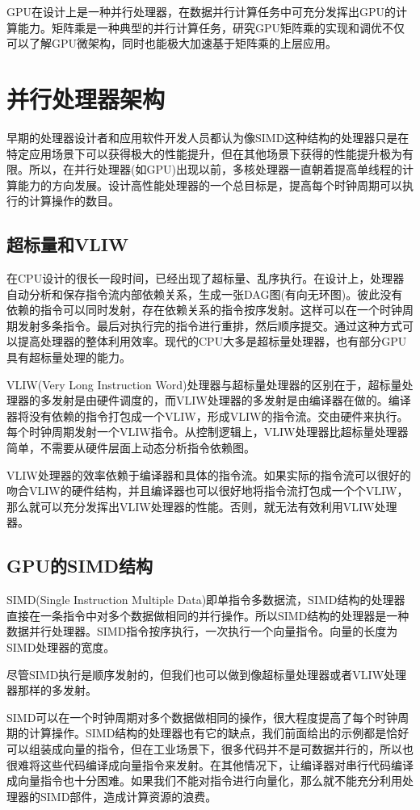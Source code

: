 GPU在设计上是一种并行处理器，在数据并行计算任务中可充分发挥出GPU的计算能力。矩阵乘是一种典型的并行计算任务，研究GPU矩阵乘的实现和调优不仅可以了解GPU微架构，同时也能极大加速基于矩阵乘的上层应用。

\section{并行处理器架构}
早期的处理器设计者和应用软件开发人员都认为像SIMD这种结构的处理器只是在特定应用场景下可以获得极大的性能提升，但在其他场景下获得的性能提升极为有限。所以，在并行处理器(如GPU)出现以前，多核处理器一直朝着提高单线程的计算能力的方向发展。设计高性能处理器的一个总目标是，提高每个时钟周期可以执行的计算操作的数目。

\subsection{超标量和VLIW}
在CPU设计的很长一段时间，已经出现了超标量、乱序执行。在设计上，处理器自动分析和保存指令流内部依赖关系，生成一张DAG图(有向无环图)。彼此没有依赖的指令可以同时发射，存在依赖关系的指令按序发射。这样可以在一个时钟周期发射多条指令。最后对执行完的指令进行重排，然后顺序提交。通过这种方式可以提高处理器的整体利用效率。现代的CPU大多是超标量处理器，也有部分GPU具有超标量处理的能力。

VLIW(Very Long Instruction Word)处理器与超标量处理器的区别在于，超标量处理器的多发射是由硬件调度的，而VLIW处理器的多发射是由编译器在做的。编译器将没有依赖的指令打包成一个VLIW，形成VLIW的指令流。交由硬件来执行。每个时钟周期发射一个VLIW指令。从控制逻辑上，VLIW处理器比超标量处理器简单，不需要从硬件层面上动态分析指令依赖图。

VLIW处理器的效率依赖于编译器和具体的指令流。如果实际的指令流可以很好的吻合VLIW的硬件结构，并且编译器也可以很好地将指令流打包成一个个VLIW，那么就可以充分发挥出VLIW处理器的性能。否则，就无法有效利用VLIW处理器。


\subsection{GPU的SIMD结构}
SIMD(Single Instruction Multiple Data)即单指令多数据流，SIMD结构的处理器直接在一条指令中对多个数据做相同的并行操作。所以SIMD结构的处理器是一种数据并行处理器。SIMD指令按序执行，一次执行一个向量指令。向量的长度为SIMD处理器的宽度。

尽管SIMD执行是顺序发射的，但我们也可以做到像超标量处理器或者VLIW处理器那样的多发射。

SIMD可以在一个时钟周期对多个数据做相同的操作，很大程度提高了每个时钟周期的计算操作。SIMD结构的处理器也有它的缺点，我们前面给出的示例都是恰好可以组装成向量的指令，但在工业场景下，很多代码并不是可数据并行的，所以也很难将这些代码编译成向量指令来发射。在其他情况下，让编译器对串行代码编译成向量指令也十分困难。如果我们不能对指令进行向量化，那么就不能充分利用处理器的SIMD部件，造成计算资源的浪费。

